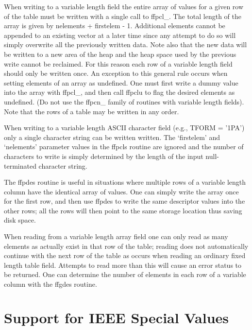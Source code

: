 When writing to a variable length field the entire array of values for
a given row of the table must be written with a single call to
ffpcl\_.  The total length of the array is given by nelements +
firstelem - 1.  Additional elements cannot be appended to an existing
vector at a later time since any attempt to do so will simply overwrite
all the previously written data.  Note also that the new data will be
written to a new area of the heap and the heap space used by the
previous write cannot be reclaimed.  For this reason each row of a
variable length field should only be written once.  An exception to
this general rule occurs when setting elements of an array as
undefined.  One must first write a dummy value into the array with
ffpcl\_, and then call ffpclu to flag the desired elements as
undefined.  (Do not use the ffpcn\_ family of routines with variable
length fields). Note that the rows of a table may be written in any
order.

When writing to a variable length ASCII character field (e.g., TFORM =
'1PA') only a single character string can be written written.  The
`firstelem' and `nelements' parameter values in the ffpcls routine are
ignored and the number of characters to write is simply determined by
the length of the input null-terminated character string.

The ffpdes routine is useful in situations where multiple rows of a
variable length column have the identical array of values.  One can
simply write the array once for the first row, and then use ffpdes to
write the same descriptor values into the other rows;  all the rows
will then point to the same storage location thus saving disk space.

When reading from a variable length array field one can only read as
many elements as actually exist in that row of the table; reading does
not automatically continue with the next row of the table as occurs
when reading an ordinary fixed length table field.  Attempts to read
more than this will cause an error status to be returned.  One can
determine the number of elements in each row of a variable column with
the ffgdes routine.


\section{Support for IEEE Special Values}

